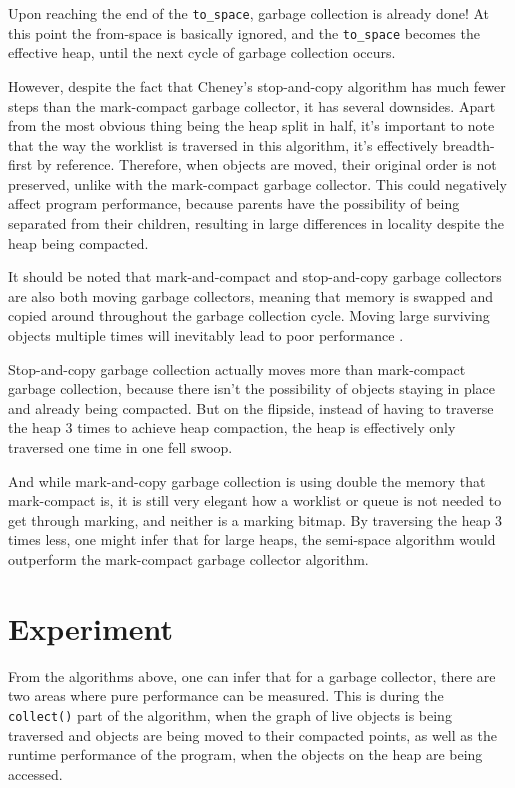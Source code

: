 \documentclass[index]{subfiles}
\begin{document}
Upon reaching the end of the \verb+to_space+, garbage collection is already done! At this point the from-space is basically ignored, and the \verb+to_space+ becomes the effective heap, until the next cycle of garbage collection occurs.

However, despite the fact that Cheney's stop-and-copy algorithm has much fewer steps than the mark-compact garbage collector, it has several downsides. Apart from the most obvious thing being the heap split in half, it's important to note that the way the worklist is traversed in this algorithm, it's effectively breadth-first by reference. Therefore, when objects are moved, their original order is not preserved, unlike with the mark-compact garbage collector. This could negatively affect program performance, because parents have the possibility of being separated from their children, resulting in large differences in locality despite the heap being compacted.

It should be noted that mark-and-compact and stop-and-copy garbage collectors are also both moving garbage collectors, meaning that memory is swapped and copied around throughout the garbage collection cycle. Moving large surviving objects multiple times will inevitably lead to poor performance \cite[Chapter~4]{gc_handbook}.

Stop-and-copy garbage collection actually moves more than mark-compact garbage collection, because there isn't the possibility of objects staying in place and already being compacted. But on the flipside, instead of having to traverse the heap 3 times to achieve heap compaction, the heap is effectively only traversed one time in one fell swoop.

And while mark-and-copy garbage collection is using double the memory that mark-compact is, it is still very elegant how a worklist or queue is not needed to  get through marking, and neither is a marking bitmap. By traversing the heap 3 times less, one might infer that for large heaps, the semi-space algorithm would outperform the mark-compact garbage collector algorithm.

\section{Experiment}

From the algorithms above, one can infer that for a garbage collector, there are two areas where pure performance can be measured. This is during the \verb+collect()+ part of the algorithm, when the graph of live objects is being traversed and objects are being moved to their compacted points, as well as the runtime performance of the program, when the objects on the heap are being accessed. 
\end{document}
